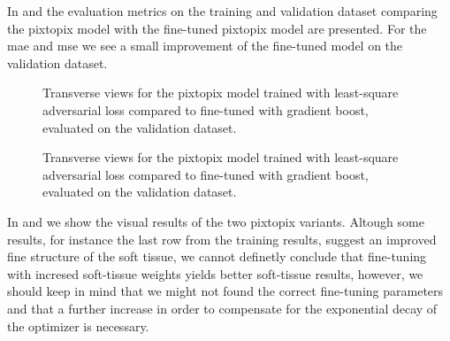 In  and  the
evaluation metrics on the training and validation dataset comparing the
pixtopix model with the fine-tuned pixtopix model are presented. For the
\gls{mae} and \gls{mse} we see a small improvement of the fine-tuned model
on the validation dataset.
\begin{figure}[h]
  \centering
  \begin{adjustbox}{width=\linewidth}
  \end{adjustbox}
  \caption{Transverse views for the pixtopix model trained with least-square
    adversarial loss compared to fine-tuned with gradient boost, evaluated on
    the validation dataset.
  }\label{fig:pixtopix:training}
\end{figure}
\begin{figure}[h]
  \centering
  \begin{adjustbox}{width=\linewidth}
  \end{adjustbox}
  \caption{Transverse views for the pixtopix model trained with least-square
    adversarial loss compared to fine-tuned with gradient boost, evaluated on
    the validation dataset.
  }\label{fig:pixtopix:validation}
\end{figure}
In  and  we show
the visual results of the two pixtopix variants. Altough some results, for
instance the last row from the training results, suggest an improved fine
structure of the soft tissue, we cannot definetly conclude that fine-tuning
with incresed soft-tissue weights yields better soft-tissue results, however,
we should keep in mind that we might not found the correct fine-tuning
parameters and that a further increase in order to compensate for the
exponential decay of the optimizer is necessary.
